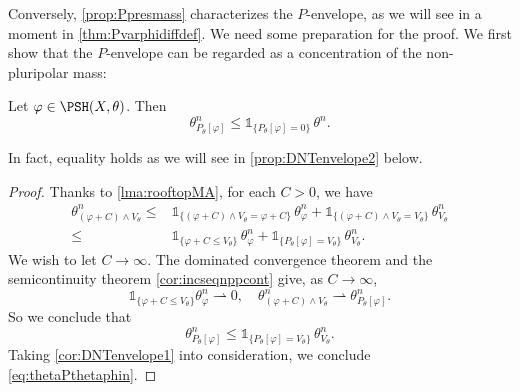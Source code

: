 Conversely, \cref{prop:Ppresmass} characterizes the $P$-envelope, as we will see in a moment in \cref{thm:Pvarphidiffdef}. We need some preparation for the proof. We first show that the $P$-envelope can be regarded as a concentration of the non-pluripolar mass:
\begin{theorem}\label{thm:Pvarphisupport}
    Let $\varphi\in \PSH(X,\theta)$. Then
    \begin{equation}\label{eq:thetaPthetaphin}
        \theta_{P_{\theta}[\varphi]}^n\leq \mathds{1}_{\{P_{\theta}[\varphi]=0\}}\,\theta^n.
    \end{equation}
\end{theorem}
In fact, equality holds as we will see in \cref{prop:DNTenvelope2} below.
\begin{proof}
    Thanks to \cref{lma:rooftopMA}, for each $C>0$, we have
    \[
    \begin{aligned}
    \theta_{(\varphi+C)\land V_{\theta}}^n\leq & \mathds{1}_{\{(\varphi+C)\land V_{\theta}=\varphi+C\} }\, \theta_{\varphi}^n+\mathds{1}_{\{(\varphi+C)\land V_{\theta}=V_{\theta}\} }\, \theta_{V_{\theta}}^n\\
    \leq & \mathds{1}_{\{\varphi+C\leq V_{\theta}\} }\, \theta_{\varphi}^n+\mathds{1}_{\{P_{\theta}[\varphi]=V_{\theta}\} } \,\theta_{V_{\theta}}^n.
    \end{aligned}
    \]
    We wish to let $C\to\infty$.
    The dominated convergence theorem and the semicontinuity theorem \cref{cor:incseqnppcont} give, as $C\to\infty$,
    \[
    \mathds{1}_{\{\varphi+C\leq V_{\theta}\} } \theta_{\varphi}^n\rightharpoonup 0,\quad
    \theta_{(\varphi+C)\land V_{\theta}}^n\rightharpoonup \theta_{P_{\theta}[\varphi]}^n.
    \]
    So we conclude that
    \[
    \theta_{P_{\theta}[\varphi]}^n\leq \mathds{1}_{\{P_{\theta}[\varphi]=V_{\theta}\}} \,\theta_{V_{\theta}}^n.
    \]
    Taking \cref{cor:DNTenvelope1} into consideration, we conclude \eqref{eq:thetaPthetaphin}.
\end{proof}

